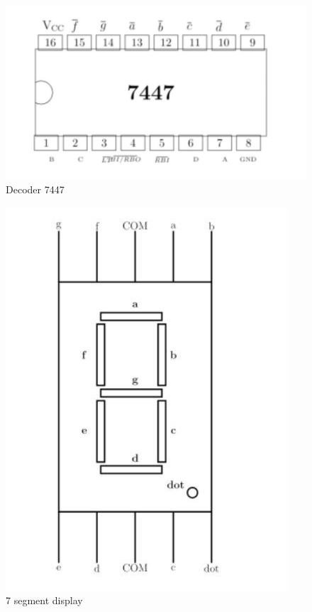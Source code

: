 \documentclass[12pt, journal]{IEEEtran}
\begin{document}
	\begin{figure}[ht]
		\includegraphics[width=\linewidth]{img/7447.jpg}
		\caption{ Decoder 7447}
		\label{fig-4}
	\end{figure}
	\begin{figure}[ht]
		\includegraphics[width=\linewidth]{img/7-seg.jpg}
		\caption{7 segment display}
		\label{fig-5}
	\end{figure}
\end{document}

